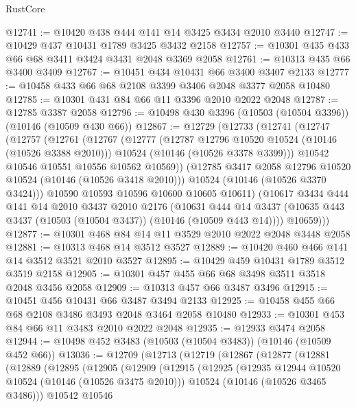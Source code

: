 \begin{lexlean}{RustCore}
\begin{coremodule}
@12741 := @10420 @438 @444 @141 @14 @3425 @3434 @2010 @3440
@12747 := @10429 @437 @10431 @1789 @3425 @3432 @2158
@12757 := @10301 @435 @433 @66 @68 @3411 @3424 @3431 @2048 @3369 @2058
@12761 := @10313 @435 @66 @3400 @3409
@12767 := @10451 @434 @10431 @66 @3400 @3407 @2133
@12777 := @10458 @433 @66 @68 @2108 @3399 @3406 @2048 @3377 @2058 @10480
@12785 := @10301 @431 @84 @66 @11 @3396 @2010 @2022 @2048
@12787 := @12785 @3387 @2058
@12796 := @10498 @430 @3396 (@10503 (@10504 @3396)) (@10146 (@10509 @430 @66))
@12867 := @12729
    (@12733
      (@12741
        (@12747
          (@12757
            (@12761
              (@12767
                (@12777
                  (@12787 @12796 @10520 @10524 (@10146 (@10526 @3388 @2010)))
                  @10524
                  (@10146 (@10526 @3378 @3399)))
                @10542
                @10546
                @10551
                @10556
                @10562
                @10569))
            (@12785 @3417 @2058 @12796 @10520 @10524 (@10146 (@10526 @3418 @2010)))
            @10524
            (@10146 (@10526 @3370 @3424)))
          @10590
          @10593
          @10596
          @10600
          @10605
          @10611)
        (@10617
          @3434
          @444
          @141
          @14
          @2010
          @3437
          @2010
          @2176
          (@10631
            @444
            @14
            @3437
            (@10635 @443 @3437 (@10503 (@10504 @3437)) (@10146 (@10509 @443 @14))))
          @10659)))
@12877 := @10301 @468 @84 @14 @11 @3529 @2010 @2022 @2048 @3448 @2058
@12881 := @10313 @468 @14 @3512 @3527
@12889 := @10420 @460 @466 @141 @14 @3512 @3521 @2010 @3527
@12895 := @10429 @459 @10431 @1789 @3512 @3519 @2158
@12905 := @10301 @457 @455 @66 @68 @3498 @3511 @3518 @2048 @3456 @2058
@12909 := @10313 @457 @66 @3487 @3496
@12915 := @10451 @456 @10431 @66 @3487 @3494 @2133
@12925 := @10458 @455 @66 @68 @2108 @3486 @3493 @2048 @3464 @2058 @10480
@12933 := @10301 @453 @84 @66 @11 @3483 @2010 @2022 @2048
@12935 := @12933 @3474 @2058
@12944 := @10498 @452 @3483 (@10503 (@10504 @3483)) (@10146 (@10509 @452 @66))
@13036 := @12709
    (@12713
      (@12719
        (@12867
          (@12877
            (@12881
              (@12889
                (@12895
                  (@12905
                    (@12909
                      (@12915
                        (@12925
                          (@12935 @12944 @10520 @10524 (@10146 (@10526 @3475 @2010)))
                          @10524
                          (@10146 (@10526 @3465 @3486)))
                        @10542
                        @10546

\end{coremodule}
\end{lexlean}
